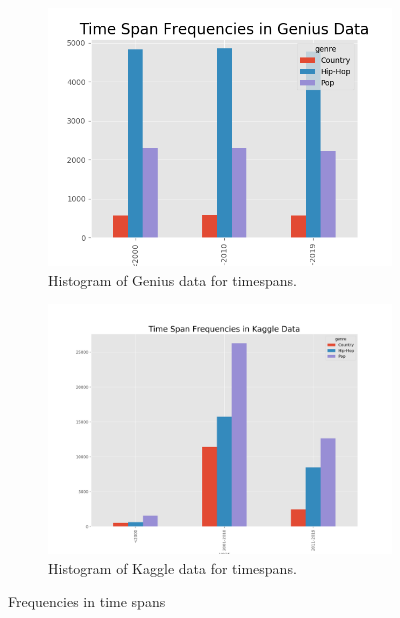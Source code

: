 \documentclass[11pt,a4paper]{article}
\begin{document}
\begin{figure}[t!]
\centering
\begin{subfigure}[t]{0.49\textwidth}
\centering
\includegraphics[width=\textwidth]{genius_histogram_binned}
	\caption{Histogram of Genius data for timespans.}
	\label{fig:binned:genius}
	\end{subfigure}
\begin{subfigure}[t]{0.49\textwidth}
\centering
\includegraphics[width=\textwidth]{kaggle_histogram_binned}
	\caption{Histogram of Kaggle data for timespans.}
	\label{fig:binned:genius}
\end{subfigure}
\caption{Frequencies in time spans}
\label{fig:histograms}
\vspace*{\floatsep}
\centering

\end{figure}
\end{document}
